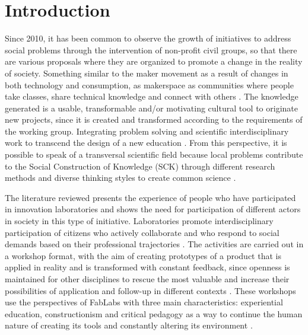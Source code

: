 \documentclass[english]{textolivre}
\begin{document}
\section{Introduction}\label{sec-intro}
Since 2010, it has been common to observe the growth of initiatives to address social problems through the intervention of non-profit civil groups, so that there are various proposals where they are organized to promote a change in the reality of society. Something similar to the maker movement as a result of changes in both technology and consumption, as makerspace as communities where people take classes, share technical knowledge and connect with others \cite{halverson2014}. The knowledge generated is a usable, transformable and/or motivating cultural tool to originate new projects, since it is created and transformed according to the requirements of the working group. Integrating problem solving and scientific interdisciplinary work to transcend the design of a new education \cite{blikstein2018}. From this perspective, it is possible to speak of a transversal scientific field \cite{jaeger2018} because local problems contribute to the Social Construction of Knowledge (SCK) through different research methods and diverse thinking styles to create common science \cite{couix2013}.

The literature reviewed presents the experience of people who have participated in innovation laboratories and shows the need for participation of different actors in society in this type of initiative. Laboratories promote interdisciplinary participation of citizens who actively collaborate and who respond to social demands based on their professional trajectories \cite{pfirman2017}. The activities are carried out in a workshop format, with the aim of creating prototypes of a product that is applied in reality and is transformed with constant feedback, since openness is maintained for other disciplines to rescue the most valuable and increase their possibilities of application and follow-up in different contexts \cite{pohl2017}. These workshops use the perspectives of FabLabs with three main characteristics: experiential education, constructionism and critical pedagogy as a way to continue the human nature of creating its tools and constantly altering its environment \cite{blikstein2013}.
\end{document}

